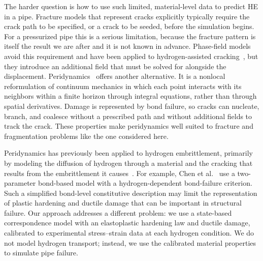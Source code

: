 \documentclass[pdflatex,sn-mathphys-num]{sn-jnl}%
\theoremstyle{thmstyleone}%
\theoremstyle{thmstyletwo}%
\theoremstyle{thmstylethree}%
\begin{document}
The harder question is how to use such limited, material-level data to predict HE in a pipe. Fracture models that represent cracks explicitly typically require the crack path to be specified, or a crack to be seeded, before the simulation begins. For a pressurized pipe this is a serious limitation, because the fracture pattern is itself the result we are after and it is not known in advance. Phase-field models avoid this requirement and have been applied to hydrogen-assisted cracking~\cite{martinezpaneda2018phasefield,navidtehrani2025generalised}, but they introduce an additional field that must be solved for alongside the displacement. Peridynamics~\cite{silling2000reformulation,silling2005meshfree,silling2007states} offers another alternative. It is a nonlocal reformulation of continuum mechanics in which each point interacts with its neighbors within a finite horizon through integral equations, rather than through spatial derivatives. Damage is represented by bond failure, so cracks can nucleate, branch, and coalesce without a prescribed path and without additional fields to track the crack. These properties make peridynamics well suited to fracture and fragmentation problems like the one considered here.

Peridynamics has previously been applied to hydrogen embrittlement, primarily by modeling the diffusion of hydrogen through a material and the cracking that results from the embrittlement it causes~\cite{demeo2016stress,ran2022crack,chen2023peridynamic}. For example, Chen et al.~\cite{chen2023peridynamic} use a two-parameter bond-based model with a hydrogen-dependent bond-failure criterion. Such a simplified bond-level constitutive description may limit the representation of plastic hardening and ductile damage that can be important in structural failure. Our approach addresses a different problem: we use a state-based correspondence model with an elastoplastic hardening law and ductile damage, calibrated to experimental stress--strain data at each hydrogen condition. We do not model hydrogen transport; instead, we use the calibrated material properties to simulate pipe failure.
\end{document}

